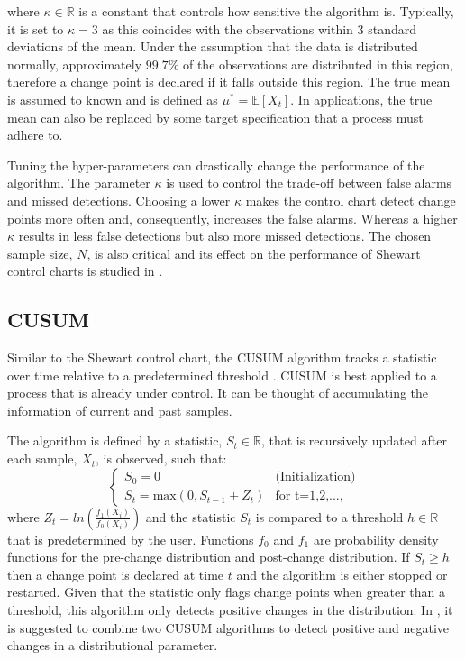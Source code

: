 where $\kappa \in \mathbb{R}$ is a constant that controls how sensitive the algorithm is. Typically, it is set to $\kappa=3$ as this coincides with the observations within $3$ standard deviations of the mean. Under the assumption that the data is distributed normally,  approximately $99.7\%$ of the observations are distributed in this region, therefore a change point is declared if it falls outside this region. The true mean is assumed to known and is defined as $\mu^* = \mathbb{E}[X_t]$. In applications, the true mean can also be replaced by some target specification that a process must adhere to.

Tuning the hyper-parameters can drastically change the performance of the algorithm. The parameter $\kappa$ is used to control the trade-off between false alarms and missed detections. Choosing a lower $\kappa$ makes the control chart detect change points more often and, consequently, increases the false alarms. Whereas a higher $\kappa$ results in less false detections but also more missed detections. The chosen sample size, $N$, is also critical and its effect on the performance of Shewart control charts is studied in \cite{haridy2017effect}.

\subsection{CUSUM}
Similar to the Shewart control chart, the CUSUM algorithm tracks a statistic over time relative to a predetermined threshold \cite{page1954continuous}. CUSUM is best applied to a process that is already under control. It can be thought of accumulating the information of current and past samples. 

The algorithm is defined by a statistic, $S_t \in \mathbb{R}$, that is recursively updated after each sample, $X_t$, is observed, such that:
\begin{equation}
  \begin{cases}
    S_0 = 0  & \text{(Initialization)} \\
    S_t = \text{max}(0, S_{t-1} + Z_t) & \text{for t=1,2,...,}
  \end{cases}
\end{equation}
where $Z_t=ln(\frac{f_{1}(X_i)}{f_{0}(X_i)})$ and the statistic $S_t$ is compared to a threshold $h \in \mathbb{R}$ that is predetermined by the user. Functions $f_0$ and $f_1$ are probability density functions for the pre-change distribution and post-change distribution.  If $S_t \geq h$ then a change point is declared at time $t$ and the algorithm is either stopped or restarted. Given that the statistic only flags change points when greater than a threshold, this algorithm only detects positive changes in the distribution. In \cite{page1954continuous}, it is suggested to combine two CUSUM algorithms to detect positive and negative changes in a distributional parameter.

